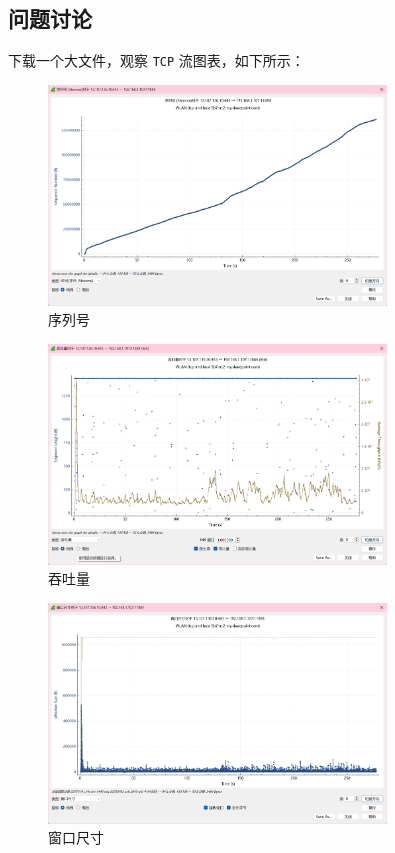 \documentclass{article}
\begin{document}
\subsection{问题讨论}

下载一个大文件，观察 \texttt{TCP} 流图表，如下所示：

\begin{figure}[H]
  \centering
  \includegraphics[width=0.8\textwidth]{img/11.png}
  \caption{序列号}
\end{figure}

\begin{figure}[H]
  \centering
  \includegraphics[width=0.8\textwidth]{img/12.png}
  \caption{吞吐量}
\end{figure}

\begin{figure}[H]
  \centering
  \includegraphics[width=0.8\textwidth]{img/13.png}
  \caption{窗口尺寸}
\end{figure}
\end{document}

